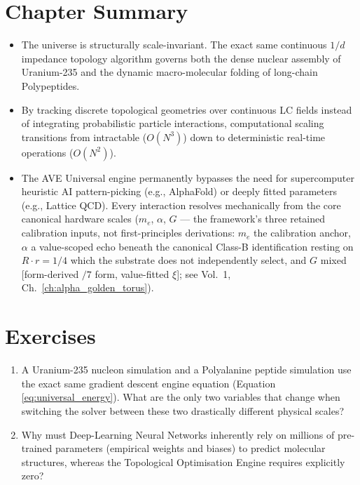 \section*{Chapter Summary}
\begin{itemize}
    \item The universe is structurally scale-invariant. The exact same continuous $1/d$ impedance topology algorithm governs both the dense nuclear assembly of Uranium-235 and the dynamic macro-molecular folding of long-chain Polypeptides.
    \item By tracking discrete topological geometries over continuous LC fields instead of integrating probabilistic particle interactions, computational scaling transitions from intractable ($O(N^3)$) down to deterministic real-time operations ($O(N^2)$).
    \item The AVE Universal engine permanently bypasses the need for supercomputer heuristic AI pattern-picking (e.g., AlphaFold) or deeply fitted parameters (e.g., Lattice QCD). Every interaction resolves mechanically from the core canonical hardware scales ($m_e$, $\alpha$, $G$ --- the framework's three retained calibration inputs, not first-principles derivations: $m_e$ the calibration anchor, $\alpha$ a value-scoped echo beneath the canonical Class-B identification resting on $R\cdot r = 1/4$ which the substrate does not independently select, and $G$ mixed [form-derived $/7$ form, value-fitted $\xi$]; see Vol.~1, Ch.~\ref{ch:alpha_golden_torus}).
\end{itemize}

\section*{Exercises}
\begin{enumerate}
    \item A Uranium-235 nucleon simulation and a Polyalanine peptide simulation use the exact same gradient descent engine equation (Equation \ref{eq:universal_energy}). What are the only two variables that change when switching the solver between these two drastically different physical scales?
    \item Why must Deep-Learning Neural Networks inherently rely on millions of pre-trained parameters (empirical weights and biases) to predict molecular structures, whereas the Topological Optimisation Engine requires explicitly zero?
\end{enumerate}
